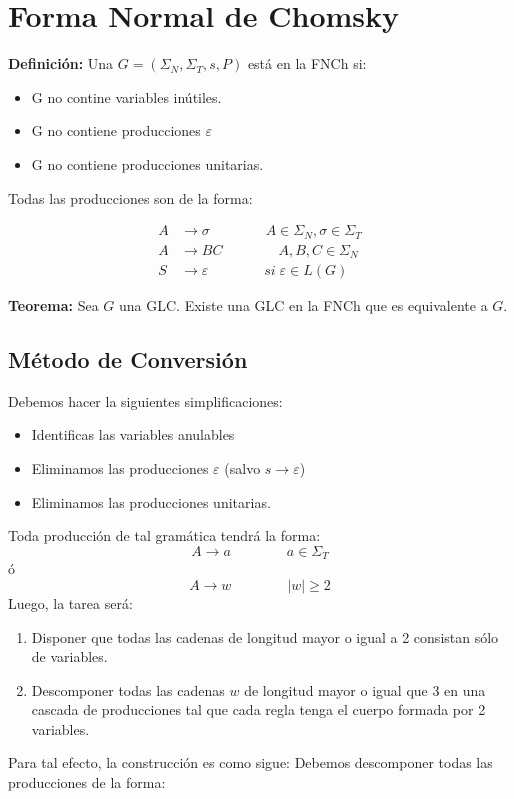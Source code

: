 \chapter{Forma Normal de Chomsky}

\textbf{Definición: }Una $G=(\Sigma_N,\Sigma_T,s,P)$ está en la FNCh si:

\begin{itemize}
\item G no contine variables inútiles.
\item G no contiene producciones $\varepsilon$
\item G no contiene producciones unitarias.
\end{itemize}

Todas las producciones son de la forma:

\begin{align*}
A &\rightarrow \sigma \qquad\qquad A\in \Sigma_N	, \sigma \in \Sigma_T\\
A &\rightarrow BC	\qquad\qquad A,B,C \in \Sigma_N	\\
S &\rightarrow \varepsilon \qquad\qquad si\; \varepsilon\in L(G)
\end{align*}

\textbf{Teorema: }Sea $G$ una GLC. Existe una GLC en la FNCh que es equivalente a $G$.

\section{Método de Conversión}
Debemos hacer la siguientes simplificaciones:
\begin{itemize}
\item Identificas las variables anulables
\item Eliminamos las producciones $\varepsilon$ (salvo $s\rightarrow\varepsilon$)
\item Eliminamos las producciones unitarias.
\end{itemize}

Toda producción de tal gramática tendrá la forma:
$$A\rightarrow a \qquad\qquad a\in \Sigma_T$$
ó
$$A\rightarrow w \qquad\qquad |w|\geq 2$$
Luego, la tarea será:
\begin{enumerate}
\item Disponer que todas las cadenas de longitud mayor o igual a 2 consistan sólo de variables.
\item Descomponer todas las cadenas $w$ de longitud mayor o igual que 3 en una cascada de producciones tal que cada regla tenga el cuerpo formada por 2 variables.
\end{enumerate}
Para tal efecto, la construcción es como sigue:
Debemos descomponer todas las producciones de la forma:

